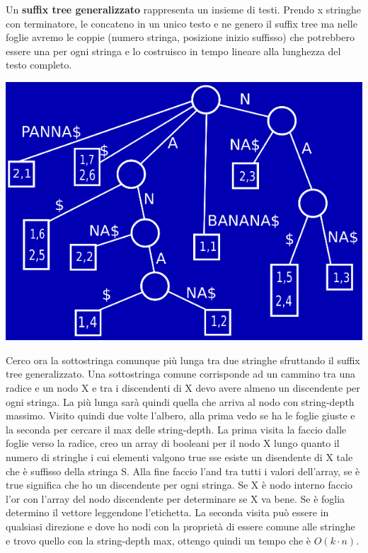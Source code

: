 \documentclass[a4paper,12pt, oneside]{book}
\begin{document}
Un \textbf{suffix tree generalizzato} rappresenta un insieme di
testi. Prendo x stringhe con terminatore, le concateno in un unico
testo e ne genero il suffix tree ma nelle foglie avremo le coppie
(numero stringa, posizione inizio suffisso) che potrebbero essere una
per ogni stringa e lo costruisco in tempo lineare alla lunghezza del
testo completo.
\begin{center}
  \includegraphics[scale = 0.5]{img/suf7.png}
\end{center}
Cerco ora la sottostringa comunque più lunga tra due
stringhe sfruttando il suffix tree generalizzato. Una sottostringa
comune corrisponde ad un cammino tra una radice e un nodo X e tra i
discendenti di X devo avere almeno un discendente  per ogni
stringa. La più lunga sarà quindi quella che arriva al nodo con
string-depth massimo. Visito quindi due volte l'albero, alla prima
vedo se ha le foglie giuste e la seconda per cercare il max delle
string-depth. La prima visita la faccio dalle foglie verso la radice,
creo un array di booleani per il nodo X lungo quanto il numero di
stringhe i cui elementi valgono true sse esiste un disendente di X tale che è
suffisso della stringa S. Alla fine faccio l'and tra tutti i valori
dell'array, se è true significa che ho un discendente per ogni
stringa. Se X è nodo interno faccio l'or con l'array del nodo
discendente per determinare se X va bene. Se è foglia determino il
vettore leggendone l'etichetta. La seconda visita può essere in
qualsiasi direzione e dove ho nodi con la proprietà di essere comune
alle stringhe e trovo quello con la string-depth max, ottengo quindi
un tempo che è $O(k\cdot n)$.
\end{document}
